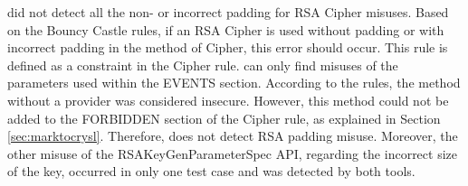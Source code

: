 \cognicryptsast{} did not detect all the non- or incorrect padding for RSA Cipher misuses. Based on the Bouncy Castle \MARK{} rules, if an RSA Cipher is used without padding or with incorrect padding in the  method of Cipher, this error should occur. This rule is defined as a constraint in the Cipher \crysl{} rule. \cognicryptsast{} can only find misuses of the parameters used within the EVENTS section. According to the \MARK{} rules, the  method without a provider was considered insecure. However, this method could not be added to the FORBIDDEN section of the Cipher \crysl{} rule, as explained in Section \ref{sec:marktocrysl}. Therefore, \cognicryptsast{} does not detect RSA padding misuse.
Moreover, the other misuse of the RSAKeyGenParameterSpec API, regarding the incorrect size of the key, occurred in only one test case and was detected by both tools.



